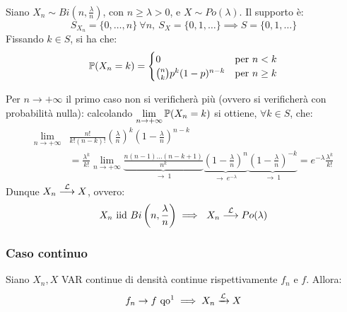 \medskip
\begin{ese} \ \\
  Siano $X_n \sim Bi\left(n, \frac \lambda n\right)$, con $n \geq \lambda > 0$, e $X \sim Po(\lambda)$.
  Il supporto è:
  $$S_{X_n} = \{ 0,\dots,n \} \ \forall n, \ S_X = \{ 0,1,\dots \} \implies S = \{ 0,1,\dots \}$$
  Fissando $k \in S$, si ha che:
  $$ \mathbb P(X_n = k) =
  \begin{cases}
  0 & \text{per } n < k \\
  \binom n k p^k (1-p)^{n-k} & \text{per } n \geq k
  \end{cases}$$

  Per $n\to +\infty$ il primo caso non si verificherà più (ovvero si verificherà con probabilità nulla): calcolando $\lim\limits_{n \to +\infty} \mathbb P(X_n = k)$ si ottiene, $\forall k \in S$, che:
  \begin{align*}
  \lim\limits_{n \to +\infty} &\frac{n!}{k!(n-k)!} \left(\frac \lambda n\right)^k \left(1 - \frac \lambda n\right)^{n-k} \\
  &=\frac {\lambda^k} {k!} \lim\limits_{n \to +\infty} \underbrace{\frac{n(n-1)\dots(n-k+1)}{n^k}}_{\to\ 1}
  \underbrace{\left( 1 - \frac \lambda n \right)^n}_{\to\ e^{-\lambda}}
  \underbrace{\left( 1 - \frac \lambda n \right)^{-k}}_{\to\ 1} = e^{-\lambda} \frac {\lambda^k}{k!}
  \end{align*}
  Dunque $X_n \stackrel{\mathcal L}{\longrightarrow} X$, ovvero:
  $$ X_n \text{ iid } Bi\left( n, \frac \lambda n \right) \implies \ X_n \stackrel{\mathcal L}{\longrightarrow} Po(\lambda)$$
\end{ese}

\subsubsection{Caso continuo}
\begin{teob}[\JPTh{18.5}]
  Siano $X_n, X$ VAR continue di densità continue rispettivamente $f_n$ e $f$.
  Allora:
  $$f_n \to f \text{ qo\footnotemark} \implies X_n \xrightarrow{\Lc} X$$
\end{teob}


